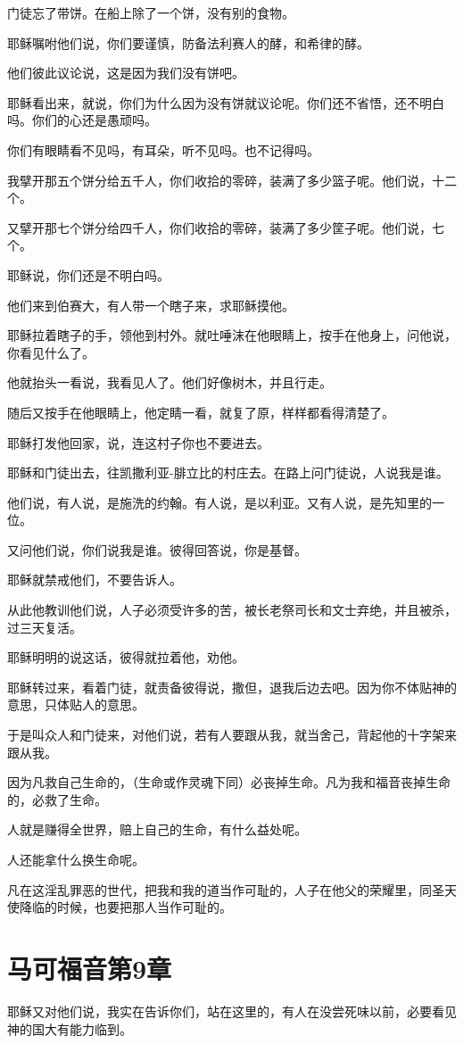 \documentclass[12pt,oneside]{book}
\begin{document}
门徒忘了带饼。在船上除了一个饼，没有别的食物。

耶稣嘱咐他们说，你们要谨慎，防备法利赛人的酵，和希律的酵。

他们彼此议论说，这是因为我们没有饼吧。

耶稣看出来，就说，你们为什么因为没有饼就议论呢。你们还不省悟，还不明白吗。你们的心还是愚顽吗。

你们有眼睛看不见吗，有耳朵，听不见吗。也不记得吗。

我擘开那五个饼分给五千人，你们收拾的零碎，装满了多少篮子呢。他们说，十二个。

又擘开那七个饼分给四千人，你们收拾的零碎，装满了多少筐子呢。他们说，七个。

耶稣说，你们还是不明白吗。

他们来到伯赛大，有人带一个瞎子来，求耶稣摸他。

耶稣拉着瞎子的手，领他到村外。就吐唾沫在他眼睛上，按手在他身上，问他说，你看见什么了。

他就抬头一看说，我看见人了。他们好像树木，并且行走。

随后又按手在他眼睛上，他定睛一看，就复了原，样样都看得清楚了。

耶稣打发他回家，说，连这村子你也不要进去。

耶稣和门徒出去，往凯撒利亚-腓立比的村庄去。在路上问门徒说，人说我是谁。

他们说，有人说，是施洗的约翰。有人说，是以利亚。又有人说，是先知里的一位。

又问他们说，你们说我是谁。彼得回答说，你是基督。

耶稣就禁戒他们，不要告诉人。

从此他教训他们说，人子必须受许多的苦，被长老祭司长和文士弃绝，并且被杀，过三天复活。

耶稣明明的说这话，彼得就拉着他，劝他。

耶稣转过来，看着门徒，就责备彼得说，撒但，退我后边去吧。因为你不体贴神的意思，只体贴人的意思。

于是叫众人和门徒来，对他们说，若有人要跟从我，就当舍己，背起他的十字架来跟从我。

因为凡救自己生命的，（生命或作灵魂下同）必丧掉生命。凡为我和福音丧掉生命的，必救了生命。

人就是赚得全世界，赔上自己的生命，有什么益处呢。

人还能拿什么换生命呢。

凡在这淫乱罪恶的世代，把我和我的道当作可耻的，人子在他父的荣耀里，同圣天使降临的时候，也要把那人当作可耻的。

\chapter{马可福音第9章}
耶稣又对他们说，我实在告诉你们，站在这里的，有人在没尝死味以前，必要看见神的国大有能力临到。
\end{document}

